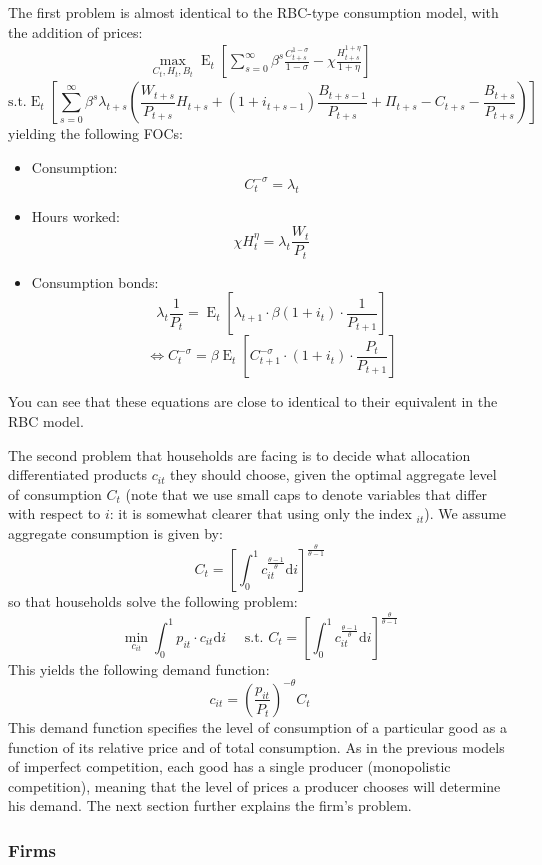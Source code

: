 \documentclass[12pt]{report}
\def\D{\mathrm{d}}
\newcommand{\Et}[1]{\operatorname{E}_t\left[#1\right]}
\def\D{\mathrm{d}}
\begin{document}
The first problem is almost identical to the RBC-type consumption model, with the addition of prices: \begin{align*}
\max_{C_t, H_t, B_t} \Et{ \sum_{s=0}^{\infty} \beta^s \frac{ C_{t+s}^{1 - \sigma} }{ 1 - \sigma } - \chi \frac{ H_{t+s}^{1 +\eta} }{ 1 +\eta } }
\end{align*}$$ \text{s.t.} \Et{\sum_{s=0}^{\infty} \beta^s \lambda_{t+s}\left(\frac{W_{t+s}}{P_{t+s}} H_{t+s} + (1 + i_{t+s-1})\frac{B_{t+s-1}}{P_{t+s}} + \Pi_{t+s} - C_{t+s} - \frac{B_{t+s}}{P_{t+s}}\right) } $$ yielding the following FOCs:\begin{itemize}
\item Consumption: $$C_t^{-\sigma} = \lambda_t $$
\item Hours worked: $$\chi H_t^\eta = \lambda_t\frac{W_t}{P_t} $$
\item Consumption bonds: $$\lambda_t\frac{1}{P_t} = \Et{\lambda_{t+1} \cdot \beta (1 + i_t)\cdot \frac{1}{P_{t+1}}} $$ $$\Leftrightarrow C_t^{-\sigma} = \beta\Et{C_{t+1}^{-\sigma} \cdot (1+i_t) \cdot \frac{P_t}{P_{t+1}}} $$
\end{itemize}
You can see that these equations are close to identical to their equivalent in the RBC model.

The second problem that households are facing is to decide what allocation differentiated products $c_{it}$ they should choose, given the optimal aggregate level of consumption $C_t$ (note that we use small caps to denote variables that differ with respect to $i$: it is somewhat clearer that using only the index $_{it}$). We assume aggregate consumption is given by: $$C_t = \left[\int_0^1 c_{it}^{\frac{\theta - 1}{\theta}} \D i\right]^{\frac{\theta}{\theta - 1}} $$ so that households solve the following problem: $$\min_{c_{it}} \int_0^1 p_{it}\cdot c_{it} \D i \quad \text{ s.t. } C_t = \left[\int_0^1 c_{it}^{\frac{\theta - 1}{\theta}} \D i\right]^{\frac{\theta}{\theta - 1}} $$ This yields the following demand function: $$ c_{it} = \left(\frac{p_{it}}{P_t}\right)^{-\theta} C_t $$ This demand function specifies the level of consumption of a particular good as a function of its relative price and of total consumption. As in the previous models of imperfect competition, each good has a single producer (monopolistic competition), meaning that the level of prices a producer chooses will determine his demand. The next section further explains the firm's problem.

\subsubsection{Firms}
\end{document}

